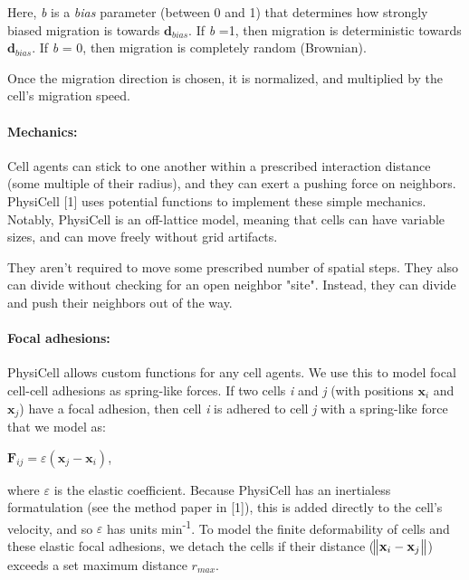 \documentclass{article}
\begin{document}
Here, \emph{b} is a \emph{bias} parameter (between 0 and 1) that
determines how strongly biased migration is towards
$\mathbf{d}_{bias}$. If \emph{b} =1, then migration is deterministic
towards $\mathbf{d}_{bias}$. If \emph{b} = 0, then migration is
completely random (Brownian).

Once the migration direction is chosen, it is normalized, and multiplied
by the cell's migration speed.

\paragraph{Mechanics:}\label{mechanics}

Cell agents can stick to one another within a prescribed interaction
distance (some multiple of their radius), and they can exert a pushing
force on neighbors. PhysiCell {[}1{]} uses potential functions to
implement these simple mechanics. Notably, PhysiCell is an off-lattice
model, meaning that cells can have variable sizes, and can move freely
without grid artifacts.

They aren't required to move some prescribed number of spatial steps.
They also can divide without checking for an open neighbor "site".
Instead, they can divide and push their neighbors out of the way.~

\paragraph{Focal adhesions:}

PhysiCell allows custom functions for any cell agents. We use this to
model focal cell-cell adhesions as spring-like forces. If two cells
\emph{i} and \emph{j} (with positions $\mathbf{x}_{i}$ and
$\mathbf{x}_{j}$) have a focal adhesion, then cell \emph{i} is
adhered to cell \emph{j} with a spring-like force that we model as:

\begin{center}
$\mathbf{F}_{ij} = \varepsilon (\mathbf{x}_{j} -
\mathbf{x}_{i})$,
\end{center}

where $\varepsilon$ is the elastic coefficient. Because PhysiCell has an
inertialess formatulation (see the method paper in {[}1{]}), this is
added directly to the cell's velocity, and so $\varepsilon$ has units
min\textsuperscript{-1}. To model the finite deformability of cells and
these elastic focal adhesions, we detach the cells if their distance
($\norm{\mathbf{x}_{i} - \mathbf{x}_{j}}$) 
exceeds a set maximum distance $r_{max}$.
\end{document}
